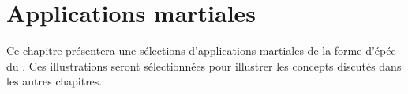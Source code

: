 \chapter{Applications martiales}\label{ch:applications}

Ce chapitre présentera une sélections d'applications martiales de la forme d'épée \Kunlun{} du \Yangjia{} \Michuan{} \Taijijian{}. Ces illustrations seront sélectionnées pour illustrer les concepts discutés dans les autres chapitres.